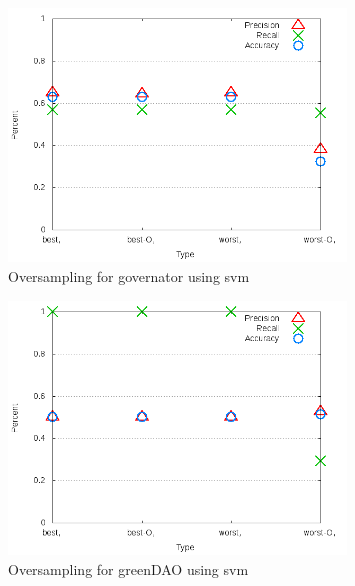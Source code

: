 \begin{figure}[!t]
\centering
\includegraphics[width=0.8\textwidth]{images/svm/test_4/governator_sample_range.png}
\caption{Oversampling for governator using \gls{svm}}
\label{fig:test_4_governator_svm}
\end{figure}

\begin{figure}[!t]
\centering
\includegraphics[width=0.8\textwidth]{images/svm/test_4/greenDAO_sample_range.png}
\caption{Oversampling for greenDAO using \gls{svm}}
\label{fig:test_4_greenDAO_svm}
\end{figure}

